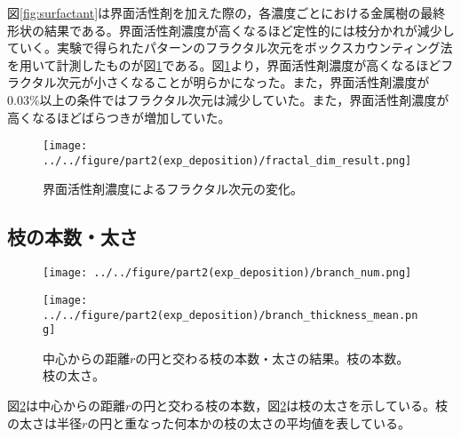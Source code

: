 \documentclass[autodetect-engine,dvi=dvipdfmx,a4paper,ja=standard,oneside,openany,11pt]{bxjsbook}
\begin{document}
図\ref{fig:surfactant}は界面活性剤を加えた際の，各濃度ごとにおける金属樹の最終形状の結果である。界面活性剤濃度が高くなるほど定性的には枝分かれが減少していく。実験で得られたパターンのフラクタル次元をボックスカウンティング法を用いて計測したものが図\ref{fig:fractal_dim}である。図\ref{fig:fractal_dim}より，界面活性剤濃度が高くなるほどフラクタル次元が小さくなることが明らかになった。また，界面活性剤濃度が0.03\%以上の条件ではフラクタル次元は減少していた。また，界面活性剤濃度が高くなるほどばらつきが増加していた。
\begin{figure}[htbp]
  \centering
  \texttt{[image: ../../figure/part2(exp\_deposition)/fractal\_dim\_result.png]}
  \caption{界面活性剤濃度によるフラクタル次元の変化。}
  \label{fig:fractal_dim}
\end{figure}

\subsection{枝の本数・太さ}

\begin{figure}[htbp]
  \begin{minipage}
    {0.45\textwidth}
    \subcaption{}
    \centering
    \texttt{[image: ../../figure/part2(exp\_deposition)/branch\_num.png]}
    \label{fig:branch_number}
  \end{minipage}
  \begin{minipage}
    {0.45\textwidth}
    \subcaption{}
    \centering
    \texttt{[image: ../../figure/part2(exp\_deposition)/branch\_thickness\_mean.png]}
    \label{fig:branch_thickness}
  \end{minipage}
  \caption{中心からの距離$r$の円と交わる枝の本数・太さの結果。枝の本数。枝の太さ。}
  \label{fig:branch}
\end{figure}

図\ref{fig:branch}は中心からの距離$r$の円と交わる枝の本数，図\ref{fig:branch}は枝の太さを示している。枝の太さは半径$r$の円と重なった何本かの枝の太さの平均値を表している。
\end{document}
